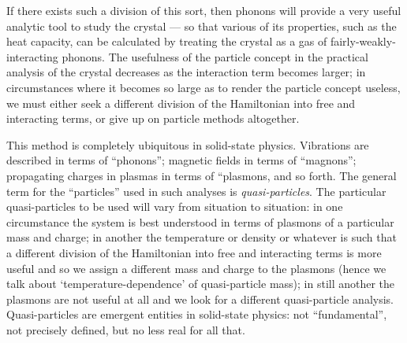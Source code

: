 \documentclass[12pt]{article}
\begin{document}
If there exists such a division of this sort, then phonons will provide a very useful analytic tool to study the crystal --- so that various of its properties, such as the heat capacity, can be calculated by treating the crystal as a gas of fairly-weakly-interacting phonons. 
The usefulness of the particle concept in the practical analysis of the crystal decreases as the interaction term becomes larger; in circumstances where it becomes so large as to render the particle concept useless, we must either seek a different division of the Hamiltonian into free and interacting terms, or give up on particle methods altogether.

This method is completely ubiquitous in solid-state physics. Vibrations are described in terms of ``phonons''; magnetic fields in terms of ``magnons''; propagating charges in plasmas in terms of ``plasmons, and so forth. The general term for the ``particles'' used in such analyses is \emph{quasi-particles}.
The particular quasi-particles to be used will vary from situation to situation: in one circumstance the system is best understood in terms of plasmons of a particular mass and charge; in another the temperature or density or whatever is such that a different division of the Hamiltonian into free and interacting terms is more useful and so we assign a different mass and charge to the plasmons (hence we talk about `temperature-dependence' of quasi-particle mass); in still another the plasmons are not useful at all and we look for a different quasi-particle analysis. 
Quasi-particles are emergent entities in solid-state physics: not ``fundamental'', not precisely defined, but no less real for all that. 
\end{document}
